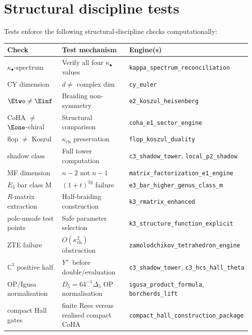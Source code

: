 \section{Structural discipline tests}
\label{sec:test-structural-discipline}

Tests enforce the following structural-discipline checks
computationally:

\begin{center}
\begin{tabular}{@{}lll@{}}
\toprule
\textbf{Check} & \textbf{Test mechanism} & \textbf{Engine(s)} \\
\midrule
$\kappa_\bullet$-spectrum & Verify all four $\kappa_\bullet$ values &
 \texttt{kappa\_spectrum\_reconciliation} \\
 CY dimension & $d \neq$ complex dim &
 \texttt{cy\_euler} \\
 $\Etwo \neq \Einf$ & Braiding non-symmetry &
 \texttt{e2\_koszul\_heisenberg} \\
 CoHA $\neq$ $\Eone$-chiral & Structural comparison &
 \texttt{coha\_e1\_sector\_engine} \\
 flop $\neq$ Koszul & $\kappa_{\mathrm{ch}}$ preservation &
 \texttt{flop\_koszul\_duality} \\
 shadow class & Full tower computation &
 \texttt{c3\_shadow\_tower}, \texttt{local\_p2\_shadow} \\
 MF dimension & $n-2$ not $n-1$ &
 \texttt{matrix\_factorization\_e1\_engine} \\
 $E_3$ bar class M & $(1+t)^{3g}$ failure &
 \texttt{e3\_bar\_higher\_genus\_class\_m} \\
 $R$-matrix extraction & Half-braiding construction &
 \texttt{k3\_rmatrix\_enhanced} \\
 pole-unsafe test points & Safe parameter selection &
 \texttt{k3\_structure\_function\_explicit} \\
 ZTE failure & $O(\kappa_{\mathrm{ch}}^2)$ obstruction &
 \texttt{zamolodchikov\_tetrahedron\_engine} \\
 $\mathbb C^3$ positive half & $Y^+$ before double/evaluation &
 \texttt{c3\_shadow\_tower}, \texttt{c3\_hcs\_hall\_theta} \\
 OP/Igusa normalisation & $D_5=64^{-1}\Delta_5$ OP normalisation &
 \texttt{igusa\_product\_formula}, \texttt{borcherds\_lift} \\
 compact Hall gates & finite Rees versus realised compact CoHA &
 \texttt{compact\_hall\_construction\_package} \\
\bottomrule
\end{tabular}
\end{center}

